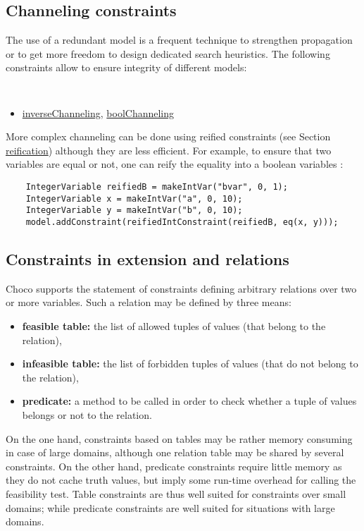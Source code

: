 \subsection{Channeling constraints}\label{model:channelingconstraints}\hypertarget{model:channelingconstraints}{}
The use of a redundant model is a frequent technique to strengthen propagation or to get more freedom to design dedicated search heuristics. The following constraints allow to ensure integrity of different models:
\begin{notedef}\tt
  \begin{itemize}
  \item \hyperlink{inversechanneling:inversechannelingconstraint}{inverseChanneling}, \hyperlink{boolchanneling:boolchannelingconstraint}{boolChanneling}
  \end{itemize}
\end{notedef}
More complex channeling can be done using reified constraints (see Section \hyperlink{model:reifiedconstraints}{reification}) although they are less efficient. For example, to ensure that two variables are equal or not, one can reify the equality into a boolean variables :
\begin{lstlisting}
	IntegerVariable reifiedB = makeIntVar("bvar", 0, 1);
	IntegerVariable x = makeIntVar("a", 0, 10);
	IntegerVariable y = makeIntVar("b", 0, 10);
	model.addConstraint(reifiedIntConstraint(reifiedB, eq(x, y)));
\end{lstlisting}

\subsection{Constraints in extension and relations}\label{model:arbitraryconstraintsinextension}\hypertarget{model:arbitraryconstraintsinextension}{}
Choco supports the statement of constraints defining arbitrary relations over two or more variables.
Such a relation may be defined by three means:
\begin{itemize}
	\item \textbf{feasible table:} the list of allowed tuples of values (that belong to the relation),
	\item \textbf{infeasible table:} the list of forbidden tuples of values (that do not belong to the relation),
	\item \textbf{predicate:} a method to be called in order to check whether a tuple of values belongs or not to the relation.
\end{itemize}
On the one hand, constraints based on tables may be rather memory consuming in case of large domains, although one relation table may be shared by several constraints. On the other hand, predicate constraints require little memory as they do not cache truth values, but imply some run-time overhead for calling the feasibility test. Table constraints are thus well suited for constraints over small domains; while predicate constraints are well suited for situations with large domains. 

